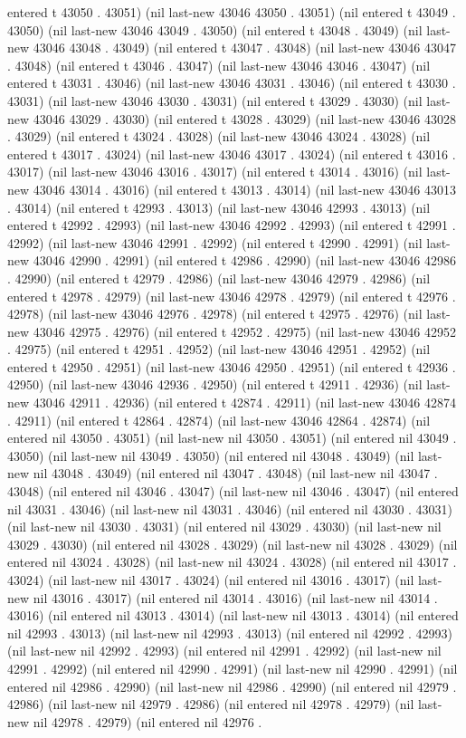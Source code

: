 entered t 43050 . 43051) (nil last-new 43046 43050 . 43051) (nil entered t 43049 . 43050) (nil last-new 43046 43049 . 43050) (nil entered t 43048 . 43049) (nil last-new 43046 43048 . 43049) (nil entered t 43047 . 43048) (nil last-new 43046 43047 . 43048) (nil entered t 43046 . 43047) (nil last-new 43046 43046 . 43047) (nil entered t 43031 . 43046) (nil last-new 43046 43031 . 43046) (nil entered t 43030 . 43031) (nil last-new 43046 43030 . 43031) (nil entered t 43029 . 43030) (nil last-new 43046 43029 . 43030) (nil entered t 43028 . 43029) (nil last-new 43046 43028 . 43029) (nil entered t 43024 . 43028) (nil last-new 43046 43024 . 43028) (nil entered t 43017 . 43024) (nil last-new 43046 43017 . 43024) (nil entered t 43016 . 43017) (nil last-new 43046 43016 . 43017) (nil entered t 43014 . 43016) (nil last-new 43046 43014 . 43016) (nil entered t 43013 . 43014) (nil last-new 43046 43013 . 43014) (nil entered t 42993 . 43013) (nil last-new 43046 42993 . 43013) (nil entered t 42992 . 42993) (nil last-new 43046 42992 . 42993) (nil entered t 42991 . 42992) (nil last-new 43046 42991 . 42992) (nil entered t 42990 . 42991) (nil last-new 43046 42990 . 42991) (nil entered t 42986 . 42990) (nil last-new 43046 42986 . 42990) (nil entered t 42979 . 42986) (nil last-new 43046 42979 . 42986) (nil entered t 42978 . 42979) (nil last-new 43046 42978 . 42979) (nil entered t 42976 . 42978) (nil last-new 43046 42976 . 42978) (nil entered t 42975 . 42976) (nil last-new 43046 42975 . 42976) (nil entered t 42952 . 42975) (nil last-new 43046 42952 . 42975) (nil entered t 42951 . 42952) (nil last-new 43046 42951 . 42952) (nil entered t 42950 . 42951) (nil last-new 43046 42950 . 42951) (nil entered t 42936 . 42950) (nil last-new 43046 42936 . 42950) (nil entered t 42911 . 42936) (nil last-new 43046 42911 . 42936) (nil entered t 42874 . 42911) (nil last-new 43046 42874 . 42911) (nil entered t 42864 . 42874) (nil last-new 43046 42864 . 42874) (nil entered nil 43050 . 43051) (nil last-new nil 43050 . 43051) (nil entered nil 43049 . 43050) (nil last-new nil 43049 . 43050) (nil entered nil 43048 . 43049) (nil last-new nil 43048 . 43049) (nil entered nil 43047 . 43048) (nil last-new nil 43047 . 43048) (nil entered nil 43046 . 43047) (nil last-new nil 43046 . 43047) (nil entered nil 43031 . 43046) (nil last-new nil 43031 . 43046) (nil entered nil 43030 . 43031) (nil last-new nil 43030 . 43031) (nil entered nil 43029 . 43030) (nil last-new nil 43029 . 43030) (nil entered nil 43028 . 43029) (nil last-new nil 43028 . 43029) (nil entered nil 43024 . 43028) (nil last-new nil 43024 . 43028) (nil entered nil 43017 . 43024) (nil last-new nil 43017 . 43024) (nil entered nil 43016 . 43017) (nil last-new nil 43016 . 43017) (nil entered nil 43014 . 43016) (nil last-new nil 43014 . 43016) (nil entered nil 43013 . 43014) (nil last-new nil 43013 . 43014) (nil entered nil 42993 . 43013) (nil last-new nil 42993 . 43013) (nil entered nil 42992 . 42993) (nil last-new nil 42992 . 42993) (nil entered nil 42991 . 42992) (nil last-new nil 42991 . 42992) (nil entered nil 42990 . 42991) (nil last-new nil 42990 . 42991) (nil entered nil 42986 . 42990) (nil last-new nil 42986 . 42990) (nil entered nil 42979 . 42986) (nil last-new nil 42979 . 42986) (nil entered nil 42978 . 42979) (nil last-new nil 42978 . 42979) (nil entered nil 42976 . 